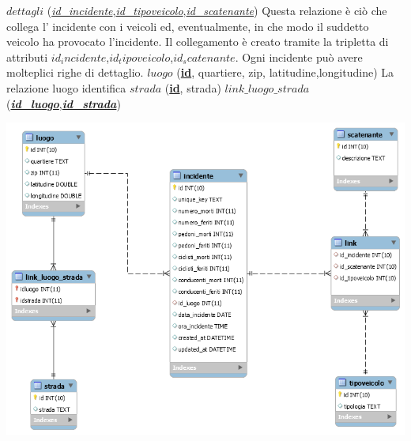 \documentclass[12pt, a4paper]{scrartcl}
\begin{document}
\newline
$dettagli$ (\textit{\underline{id\_incidente}},\textit{\underline{id\_tipoveicolo}},\textit{\underline{id\_scatenante}})
\newline
Questa relazione è ciò che collega l' incidente con i veicoli ed, eventualmente, in che modo il suddetto veicolo ha provocato l'incidente.
Il collegamento è creato tramite la tripletta di attributi $id_incidente$,$id_tipoveicolo$,$id_scatenante$.
Ogni incidente può avere molteplici righe di dettaglio. 
\newline
\newline
$luogo$ (\textbf{\underline{id}}, quartiere, zip, latitudine,longitudine)
\newline
La relazione luogo identifica
\newline
\newline
$strada$ (\textbf{\underline{id}}, strada)
\newline
\newline
$link\_luogo\_strada$ (\textit{\textbf{\underline{id\_luogo}}},\textit{\textbf{\underline{id\_strada}}})
\newline
\newline
\begin{center}

\includegraphics[scale=0.6]{ER.png}
\end{center}
\end{document}
